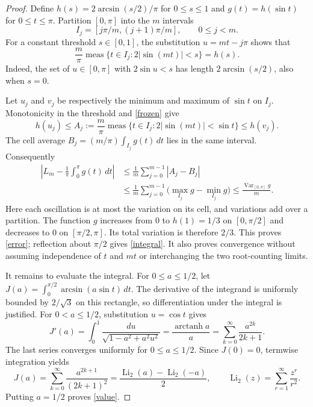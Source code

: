 \documentclass[11pt]{article}
\newcommand{\meas}{\operatorname{meas}}
\newcommand{\Li}{\operatorname{Li}_2}
\begin{document}
\begin{proof}
Define $h(s)=2\arcsin(s/2)/\pi$ for $0\leq s\leq1$ and
$g(t)=h(\sin t)$ for $0\leq t\leq\pi$.
Partition $[0,\pi]$ into the $m$ intervals
\[
 I_j=[j\pi/m,(j+1)\pi/m],\qquad 0\leq j<m.
\]
For a constant threshold $s\in[0,1]$, the substitution
$u=mt-j\pi$ shows that
\begin{equation}\label{frozen}
 \frac{m}{\pi}\meas\{t\in I_j:2|\sin(mt)|<s\}=h(s).
\end{equation}
Indeed, the set of $u\in[0,\pi]$ with $2\sin u<s$ has length
$2\arcsin(s/2)$, also when $s=0$.

Let $u_j$ and $v_j$ be respectively the minimum and maximum of
$\sin t$ on $I_j$. Monotonicity in the threshold and
\eqref{frozen} give
\[
 h(u_j)\leq A_j:=\frac{m}{\pi}\meas
 \{t\in I_j:2|\sin(mt)|<\sin t\}\leq h(v_j).
\]
The cell average $B_j=(m/\pi)\int_{I_j}g(t)\,dt$ lies in the
same interval. Consequently
\begin{align*}
 \left|L_m-\frac1\pi\int_0^\pi g(t)\,dt\right|
 &\leq\frac1m\sum_{j=0}^{m-1}|A_j-B_j|\\
 &\leq\frac1m\sum_{j=0}^{m-1}
                  \bigl(\max_{I_j}g-\min_{I_j}g\bigr)
 \leq\frac{\operatorname{Var}_{[0,\pi]}g}{m}.
\end{align*}
Here each oscillation is at most the variation on its cell,
and variations add over a partition. The function $g$ increases
from $0$ to $h(1)=1/3$ on $[0,\pi/2]$ and decreases to $0$
on $[\pi/2,\pi]$. Its total variation is therefore $2/3$.
This proves \eqref{error}; reflection about $\pi/2$ gives
\eqref{integral}. It also proves convergence without assuming
independence of $t$ and $mt$ or interchanging the two root-counting
limits.

It remains to evaluate the integral. For $0\leq a\leq1/2$, let
$J(a)=\int_0^{\pi/2}\arcsin(a\sin t)\,dt$.
The derivative of the integrand is uniformly bounded by
$2/\sqrt3$ on this rectangle, so differentiation under the integral
is justified. For $0<a\leq1/2$, substitution $u=\cos t$ gives
\[
 J'(a)=\int_0^1\frac{du}{\sqrt{1-a^2+a^2u^2}}
      =\frac{\operatorname{arctanh}a}{a}
      =\sum_{k=0}^{\infty}\frac{a^{2k}}{2k+1}.
\]
The last series converges uniformly for $0\leq a\leq1/2$.
Since $J(0)=0$, termwise integration yields
\[
 J(a)=\sum_{k=0}^{\infty}\frac{a^{2k+1}}{(2k+1)^2}
     =\frac{\Li(a)-\Li(-a)}2,
 \qquad \Li(z)=\sum_{r=1}^{\infty}\frac{z^r}{r^2}.
\]
Putting $a=1/2$ proves \eqref{value}.
\end{proof}
\end{document}
